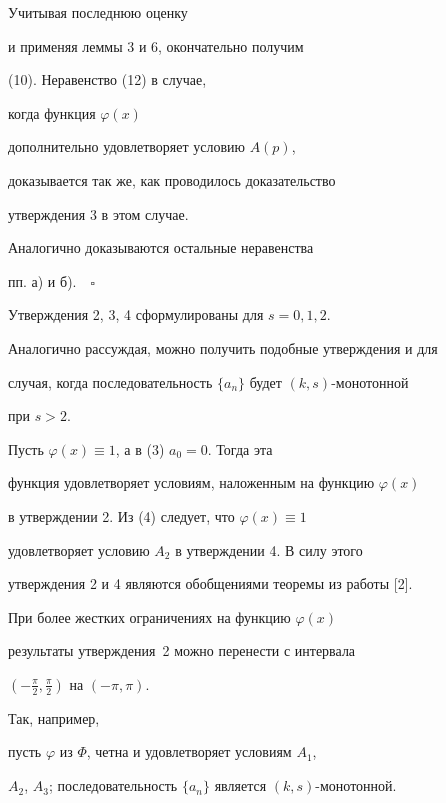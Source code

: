 Учитывая последнюю оценку


и применяя леммы 3 и 6, окончательно получим


(10). Неравенство (12) в случае, 


когда функция $ \varphi (x)$


дополнительно удовлетворяет условию $A(p)$, 


доказывается так же, как проводилось доказательство


утверждения 3 в этом случае. 


Аналогично доказываются остальные неравенства


пп. а) и б).$\quad\square$





\begin{note}


Утверждения 2, 3, 4  сформулированы для $s=0, 1, 2$.


Аналогично рассуждая, можно получить подобные утверждения и для


случая, когда последовательность $\{a_n \} $ будет $(k,s)$-монотонной


при $s>2$.


\end{note}





\begin{note}


Пусть $ \varphi (x) \equiv 1$, а в (3) $a_0=0$. Тогда эта 


функция удовлетворяет условиям, наложенным на функцию $ \varphi (x)$


в утверждении 2. Из (4) следует, что $ \varphi (x) \equiv 1$


удовлетворяет условию $A_2$ в утверждении 4. В силу этого


утверждения 2 и 4 являются обобщениями теоремы из работы [2].


\end{note}





\begin{note}


При более жестких ограничениях на функцию $\varphi (x)$


результаты утверждения~2 можно перенести с интервала


$(- \frac {\pi}{2}, \frac{\pi}{2})$ на $(- \pi,\pi)$.





Так, например,


пусть $\varphi$ из $\Phi$, четна и удовлетворяет условиям $A_1$,


$A_2$, $A_3$; последовательность $\{a_n\}$ является $(k,s)$-монотонной.


\end{note}





